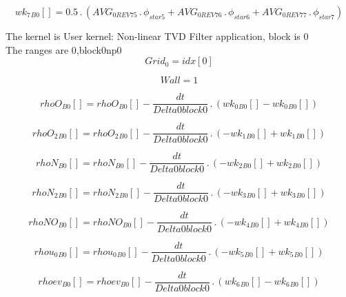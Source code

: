 \documentclass{article}
\begin{document}
\begin{dmath}{wk_{7}{_{B0}}}[{}] = 0.5 \,.\, \left(AVG_{0 REV 75} \,.\, \phi_{star 5} + AVG_{0 REV 76} \,.\, \phi_{star 6} + AVG_{0 REV 77} \,.\, \phi_{star 7}\right)\end{dmath}

\noindent The kernel is User kernel: Non-linear TVD Filter application, block is 0\\\noindent The ranges are 0,block0np0\\\begin{dmath}Grid_{0} = {idx}[{0}]\end{dmath}

\begin{dmath}Wall = 1\end{dmath}

\begin{dmath}{rhoO{_{B0}}}[{}] = {rhoO{_{B0}}}[{}] - \frac{dt}{Delta0block0} \,.\, \left({wk_{0}{_{B0}}}[{}] - {wk_{0}{_{B0}}}[{}]\right)\end{dmath}

\begin{dmath}{rhoO_{2}{_{B0}}}[{}] = {rhoO_{2}{_{B0}}}[{}] - \frac{dt}{Delta0block0} \,.\, \left(- {wk_{1}{_{B0}}}[{}] + {wk_{1}{_{B0}}}[{}]\right)\end{dmath}

\begin{dmath}{rhoN{_{B0}}}[{}] = {rhoN{_{B0}}}[{}] - \frac{dt}{Delta0block0} \,.\, \left(- {wk_{2}{_{B0}}}[{}] + {wk_{2}{_{B0}}}[{}]\right)\end{dmath}

\begin{dmath}{rhoN_{2}{_{B0}}}[{}] = {rhoN_{2}{_{B0}}}[{}] - \frac{dt}{Delta0block0} \,.\, \left(- {wk_{3}{_{B0}}}[{}] + {wk_{3}{_{B0}}}[{}]\right)\end{dmath}

\begin{dmath}{rhoNO{_{B0}}}[{}] = {rhoNO{_{B0}}}[{}] - \frac{dt}{Delta0block0} \,.\, \left(- {wk_{4}{_{B0}}}[{}] + {wk_{4}{_{B0}}}[{}]\right)\end{dmath}

\begin{dmath}{rhou_{0}{_{B0}}}[{}] = {rhou_{0}{_{B0}}}[{}] - \frac{dt}{Delta0block0} \,.\, \left(- {wk_{5}{_{B0}}}[{}] + {wk_{5}{_{B0}}}[{}]\right)\end{dmath}

\begin{dmath}{rhoev{_{B0}}}[{}] = {rhoev{_{B0}}}[{}] - \frac{dt}{Delta0block0} \,.\, \left({wk_{6}{_{B0}}}[{}] - {wk_{6}{_{B0}}}[{}]\right)\end{dmath}
\end{document}
